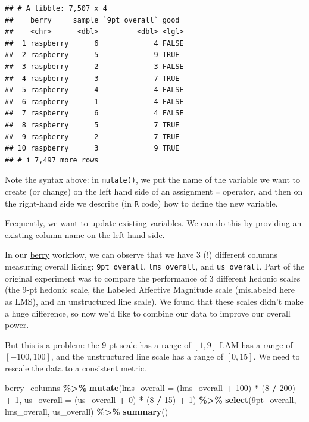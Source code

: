 \documentclass[
]{book}
\newenvironment{Shaded}{\begin{snugshade}}{\end{snugshade}}
\newcommand{\AttributeTok}[1]{\textcolor[rgb]{0.13,0.29,0.53}{#1}}
\newcommand{\DecValTok}[1]{\textcolor[rgb]{0.00,0.00,0.81}{#1}}
\newcommand{\FunctionTok}[1]{\textcolor[rgb]{0.13,0.29,0.53}{\textbf{#1}}}
\newcommand{\NormalTok}[1]{#1}
\newcommand{\SpecialCharTok}[1]{\textcolor[rgb]{0.81,0.36,0.00}{\textbf{#1}}}
\newcommand{\StringTok}[1]{\textcolor[rgb]{0.31,0.60,0.02}{#1}}
\begin{document}
\begin{verbatim}
## # A tibble: 7,507 x 4
##    berry     sample `9pt_overall` good 
##    <chr>      <dbl>         <dbl> <lgl>
##  1 raspberry      6             4 FALSE
##  2 raspberry      5             9 TRUE 
##  3 raspberry      2             3 FALSE
##  4 raspberry      3             7 TRUE 
##  5 raspberry      4             4 FALSE
##  6 raspberry      1             4 FALSE
##  7 raspberry      6             4 FALSE
##  8 raspberry      5             7 TRUE 
##  9 raspberry      2             7 TRUE 
## 10 raspberry      3             9 TRUE 
## # i 7,497 more rows
\end{verbatim}

Note the syntax above: in \texttt{mutate()}, we put the name of the variable we want to create (or change) on the left hand side of an assignment \texttt{=} operator, and then on the right-hand side we describe (in \texttt{R} code) how to define the new variable.

Frequently, we want to update existing variables. We can do this by providing an existing column name on the left-hand side.

In our \protect\hyperlink{berry}{berry} workflow, we can observe that we have 3 (!) different columns measuring overall liking: \texttt{9pt\_overall}, \texttt{lms\_overall}, and \texttt{us\_overall}. Part of the original experiment was to compare the performance of 3 different hedonic scales (the 9-pt hedonic scale, the Labeled Affective Magnitude scale (mislabeled here as LMS), and an unstructured line scale). We found that these scales didn't make a huge difference, so now we'd like to combine our data to improve our overall power.

But this is a problem: the 9-pt scale has a range of \([1,9]\) LAM has a range of \([-100,100]\), and the unstructured line scale has a range of \([0,15]\). We need to rescale the data to a consistent metric.

\begin{Shaded}
\begin{Highlighting}[]
\NormalTok{berry\_columns }\SpecialCharTok{\%\textgreater{}\%}
  \FunctionTok{mutate}\NormalTok{(}\AttributeTok{lms\_overall =}\NormalTok{ (lms\_overall }\SpecialCharTok{+} \DecValTok{100}\NormalTok{) }\SpecialCharTok{*}\NormalTok{ (}\DecValTok{8} \SpecialCharTok{/} \DecValTok{200}\NormalTok{) }\SpecialCharTok{+} \DecValTok{1}\NormalTok{,}
         \AttributeTok{us\_overall =}\NormalTok{ (us\_overall }\SpecialCharTok{+} \DecValTok{0}\NormalTok{) }\SpecialCharTok{*}\NormalTok{ (}\DecValTok{8} \SpecialCharTok{/} \DecValTok{15}\NormalTok{) }\SpecialCharTok{+} \DecValTok{1}\NormalTok{) }\SpecialCharTok{\%\textgreater{}\%}
  \FunctionTok{select}\NormalTok{(}\StringTok{\textasciigrave{}}\AttributeTok{9pt\_overall}\StringTok{\textasciigrave{}}\NormalTok{, lms\_overall, us\_overall) }\SpecialCharTok{\%\textgreater{}\%}
  \FunctionTok{summary}\NormalTok{()}
\end{Highlighting}
\end{Shaded}
\end{document}

